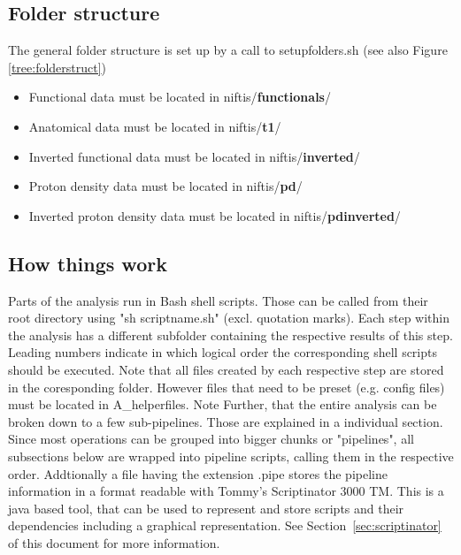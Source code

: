 \documentclass[12pt,a4paper]{scrartcl}
\begin{document}
\subsection{Folder structure}
\label{sec:dirstruct}
The general folder structure is set up by a call to setupfolders.sh (see also Figure \ref{tree:folderstruct})
\begin{itemize}
\item Functional data must be located in niftis/\textbf{functionals}/
\item Anatomical data must be located in niftis/\textbf{t1}/
\item Inverted functional data must be located in niftis/\textbf{inverted}/
\item Proton density data must be located in niftis/\textbf{pd}/
\item Inverted proton density data must be located in niftis/\textbf{pdinverted}/
\end{itemize}

\subsection{How things work}
Parts of the analysis run in Bash shell scripts. Those can be called from their root directory using "sh scriptname.sh" (excl. quotation marks). Each step within the analysis has a different subfolder containing the respective results of this step. Leading numbers indicate in which logical order the corresponding shell scripts should be executed. Note that all files created by each respective step are stored in the coresponding folder. However files that need to be preset (e.g. config files) must be located in A\_helperfiles. Note Further, that the entire analysis can be broken down to a few sub-pipelines. Those are explained in a individual section.\\

\noindent Since most operations can be grouped into bigger chunks or "pipelines", all subsections below are wrapped into pipeline scripts, calling them in the respective order. Addtionally a file having the extension .pipe stores the pipeline information in a format readable with Tommy's Scriptinator 3000 TM. This is a java based tool, that can be used to represent and store scripts and their dependencies including a graphical representation. See Section~\ref{sec:scriptinator} of this document for more information.
\end{document}

